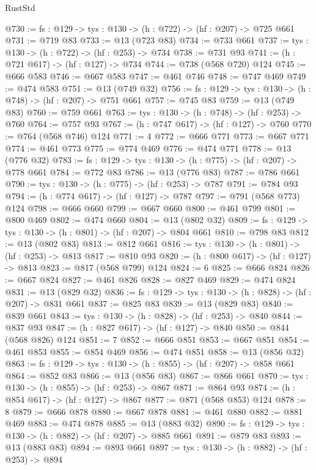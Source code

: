 \begin{lexlean}{RustStd}
\begin{coremodule}
@730 := {fs : @129} -> {tys : @130} -> (h : @722) -> (hf : @207) -> @725 @661
@731 := @719 @83
@733 := @13 (@723 @83)
@734 := @733 @661
@737 := {tys : @130} -> (h : @722) -> (hf : @253) -> @734
@738 := @731 @93
@741 := (h : @721 @617) -> (hf : @127) -> @734
@744 := @738 (@568 @720) @124
@745 := @666 @583
@746 := @667 @583
@747 := @461 @746
@748 := @747 @469
@749 := @474 @583
@751 := @13 (@749 @32)
@756 := {fs : @129} -> {tys : @130} -> (h : @748) -> (hf : @207) -> @751 @661
@757 := @745 @83
@759 := @13 (@749 @83)
@760 := @759 @661
@763 := {tys : @130} -> (h : @748) -> (hf : @253) -> @760
@764 := @757 @93
@767 := (h : @747 @617) -> (hf : @127) -> @760
@770 := @764 (@568 @746) @124
@771 := 4
@772 := @666 @771
@773 := @667 @771
@774 := @461 @773
@775 := @774 @469
@776 := @474 @771
@778 := @13 (@776 @32)
@783 := {fs : @129} -> {tys : @130} -> (h : @775) -> (hf : @207) -> @778 @661
@784 := @772 @83
@786 := @13 (@776 @83)
@787 := @786 @661
@790 := {tys : @130} -> (h : @775) -> (hf : @253) -> @787
@791 := @784 @93
@794 := (h : @774 @617) -> (hf : @127) -> @787
@797 := @791 (@568 @773) @124
@798 := @666 @660
@799 := @667 @660
@800 := @461 @799
@801 := @800 @469
@802 := @474 @660
@804 := @13 (@802 @32)
@809 := {fs : @129} -> {tys : @130} -> (h : @801) -> (hf : @207) -> @804 @661
@810 := @798 @83
@812 := @13 (@802 @83)
@813 := @812 @661
@816 := {tys : @130} -> (h : @801) -> (hf : @253) -> @813
@817 := @810 @93
@820 := (h : @800 @617) -> (hf : @127) -> @813
@823 := @817 (@568 @799) @124
@824 := 6
@825 := @666 @824
@826 := @667 @824
@827 := @461 @826
@828 := @827 @469
@829 := @474 @824
@831 := @13 (@829 @32)
@836 := {fs : @129} -> {tys : @130} -> (h : @828) -> (hf : @207) -> @831 @661
@837 := @825 @83
@839 := @13 (@829 @83)
@840 := @839 @661
@843 := {tys : @130} -> (h : @828) -> (hf : @253) -> @840
@844 := @837 @93
@847 := (h : @827 @617) -> (hf : @127) -> @840
@850 := @844 (@568 @826) @124
@851 := 7
@852 := @666 @851
@853 := @667 @851
@854 := @461 @853
@855 := @854 @469
@856 := @474 @851
@858 := @13 (@856 @32)
@863 := {fs : @129} -> {tys : @130} -> (h : @855) -> (hf : @207) -> @858 @661
@864 := @852 @83
@866 := @13 (@856 @83)
@867 := @866 @661
@870 := {tys : @130} -> (h : @855) -> (hf : @253) -> @867
@871 := @864 @93
@874 := (h : @854 @617) -> (hf : @127) -> @867
@877 := @871 (@568 @853) @124
@878 := 8
@879 := @666 @878
@880 := @667 @878
@881 := @461 @880
@882 := @881 @469
@883 := @474 @878
@885 := @13 (@883 @32)
@890 := {fs : @129} -> {tys : @130} -> (h : @882) -> (hf : @207) -> @885 @661
@891 := @879 @83
@893 := @13 (@883 @83)
@894 := @893 @661
@897 := {tys : @130} -> (h : @882) -> (hf : @253) -> @894

\end{coremodule}
\end{lexlean}
